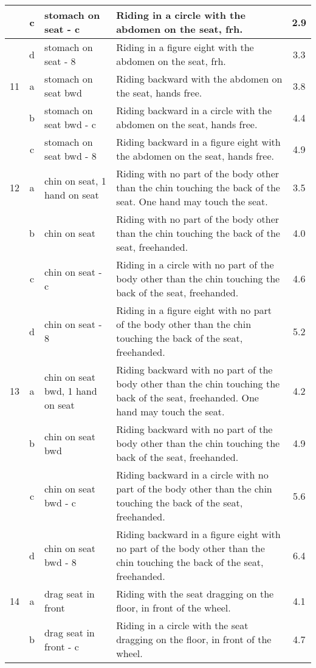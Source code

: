\begin{longtable}{|r|c|p{4cm}|p{8cm}|c|}
\hline
  & c & stomach on seat - c & Riding in a circle with the abdomen on the seat, frh. & 2.9 \\ 
\hline
  & d & stomach on seat - 8 & Riding in a figure eight with the abdomen on the seat, frh. & 3.3 \\ 
\hline
11  & a & stomach on seat bwd & Riding backward with the abdomen on the seat, hands free. & 3.8 \\ 
\hline
  & b & stomach on seat bwd - c & Riding backward in a circle with the abdomen on the seat, hands free. & 4.4 \\ 
\hline
  & c & stomach on seat bwd - 8 & Riding backward in a figure eight with the abdomen on the seat, hands free. & 4.9 \\ 
\hline
12  & a & chin on seat, 1 hand on seat  & Riding with no part of the body other than the chin touching the back of the seat. One hand may touch the seat. & 3.5 \\ 
\hline
  & b & chin on seat  & Riding with no part of the body other than the chin touching the back of the seat, freehanded.  & 4.0 \\ 
\hline
  & c & chin on seat - c  & Riding in a circle with no part of the body other than the chin touching the back of the seat, freehanded.  & 4.6 \\ 
\hline
  & d & chin on seat - 8  & Riding in a figure eight with no part of the body other than the chin touching the back of the seat, freehanded.  & 5.2 \\ 
\hline
13  & a & chin on seat bwd, 1 hand on seat  & Riding backward with no part of the body other than the chin touching the back of the seat, freehanded. One hand may touch the seat.  & 4.2 \\ 
\hline
  & b & chin on seat bwd  & Riding backward with no part of the body other than the chin touching the back of the seat, freehanded. & 4.9 \\ 
\hline
  & c & chin on seat bwd - c  & Riding backward in a circle with no part of the body other than the chin touching the back of the seat, freehanded. & 5.6 \\ 
\hline
  & d & chin on seat bwd - 8  & Riding backward in a figure eight with no part of the body other than the chin touching the back of the seat, freehanded. & 6.4 \\ 
\hline
14  & a & drag seat in front  & Riding with the seat dragging on the floor, in front of the wheel.  & 4.1 \\ 
\hline
  & b & drag seat in front - c  & Riding in a circle with the seat dragging on the floor, in front of the wheel.  & 4.7 \\ 

\end{longtable}

